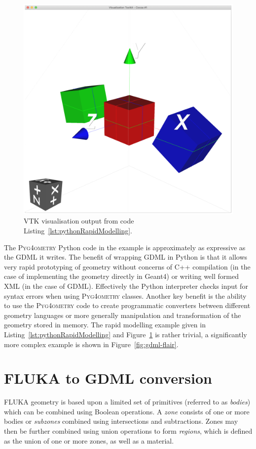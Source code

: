 \documentclass[final,5p,times,twocolumn]{elsarticle}
\newcommand{\PYGEOMETRY}{\textsc{Pyg4ometry}}
\begin{document}
\begin{figure}[htbp]
\begin{center}
\includegraphics[width=0.9\columnwidth]{./diagrams/rapidModelling.pdf}
\caption{VTK visualisation output from code Listing~\ref{lst:pythonRapidModelling}.}
\label{fig:rapidModellingExample}
\end{center}
\end{figure}

The \PYGEOMETRY{} Python code in the example is approximately as expressive 
as the GDML it writes. The benefit of wrapping GDML in Python is that it allows 
 very rapid prototyping of geometry without concerns of C++ compilation  (in the 
case of implementing the geometry directly in Geant4) or writing well formed XML (in the case of GDML). Effectively
the Python interpreter checks input for syntax errors when using \PYGEOMETRY{} classes. 
Another key benefit is the ability to use the \PYGEOMETRY{} code to create 
programmatic converters between different geometry languages or more generally 
manipulation and transformation of the geometry stored in memory. The rapid modelling 
example given in Listing~\ref{lst:pythonRapidModelling} and Figure~\ref{fig:rapidModellingExample} 
is rather trivial, a significantly more complex example is shown in Figure~\ref{fig:gdml-flair}.

\section{FLUKA to GDML conversion}
FLUKA geometry is based upon a limited set of primitives (referred to as
\emph{bodies}) which can be combined using Boolean operations. A
\emph{zone} consists of one or more bodies or \emph{subzones} combined
using intersections and subtractions.  Zones may then be further combined
using union operations to form \emph{regions}, which is defined as the
union of one or more zones, as well as a material.
\end{document}
